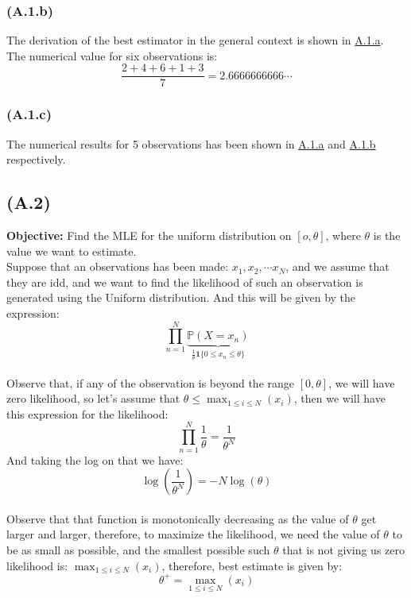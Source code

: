 \documentclass[]{article}
\begin{document}
        \subsubsection*{(A.1.b)}\label{A.1.b}
            The derivation of the best estimator in the general context is shown in \hyperref[A.1.a]{A.1.a}. 
            \\[1em]
            The numerical value for six observations is: 
            $$
                \frac{2 + 4 + 6 + 1 + 3}{7} = 2.6666666666\cdots
            $$
        \subsubsection*{(A.1.c)}
            The numerical results for 5 observations has been shown in \hyperref[A.1.a]{A.1.a} and \hyperref[A.1.b]{A.1.b} respectively. 
            
    \subsection*{(A.2)}
        \textbf{Objective: } Find the MLE for the uniform distribution on $[o, \theta]$, where $\theta$ is the value we want to estimate.
        \\[1em]
        Suppose that an observations has been made: $x_1, x_2, \cdots x_N$, and we assume that they are idd, and we want to find the likelihood of such an observation is generated using the Uniform distribution. And this will be given by the expression: 
        \begin{equation*}\tag{A.2.1}\label{eqn:A.2.1}
            \prod_{n = 1}^{N} 
            \underbrace{
            \mathbb{P}\left(X = x_n\right)}_{\frac{1}{\theta}\mathbf{1}\{0 \le x_n \le \theta\}}
        \end{equation*}
        \\[1em]
        Observe that, if any of the observation is beyond the range $[0, \theta]$, we will have zero likelihood, so let's assume that $\theta \le \max_{1\le i \le N}(x_i)$, then we will have this expression for the likelihood: 
        \begin{equation*}\tag{A.2.2}\label{eqn:A.2.2}
            \prod_{n = 1}^{N} 
            \frac{1}{\theta} = \frac{1}{\theta^N}
        \end{equation*}
        And taking the log on that we have: 
        \begin{equation*}\tag{A.2.3}\label{eqn:A.2.3}
            \log\left(\frac{1}{\theta^N}\right) = -N\log(\theta)
        \end{equation*}
        \\[1em]
        Observe that that function is monotonically decreasing as the value of $\theta$ get larger and larger, therefore, to maximize the likelihood, we need the value of $\theta$ to be as small as possible, and the smallest possible such $\theta$ that is not giving us zero likelihood is: $\max_{1\le i \le N}(x_i)$, therefore, best estimate is given by: 
        $$
            \theta^+ =\max_{1\le i \le N}(x_i)
        $$
\end{document}
